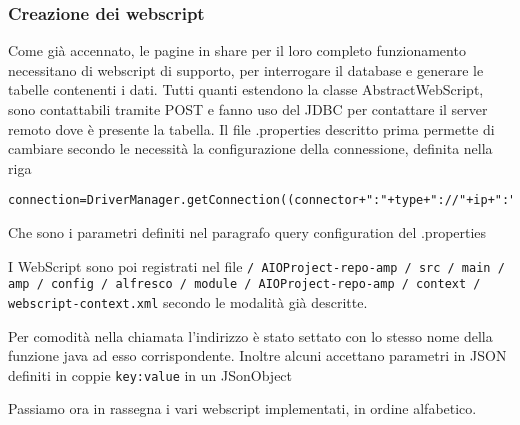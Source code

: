 \subsubsection{Creazione dei webscript}
Come già accennato, le pagine in share per il loro completo funzionamento necessitano di webscript di supporto, per interrogare il database e generare le tabelle contenenti i dati.  Tutti quanti estendono la classe AbstractWebScript, sono contattabili tramite POST e fanno uso del JDBC per contattare il server remoto dove è presente la tabella. Il file .properties descritto prima permette di cambiare secondo le necessità la configurazione della connessione, definita nella riga
\begin{lstlisting}
connection=DriverManager.getConnection((connector+":"+type+"://"+ip+":"+port+"/"+server),id,password);
\end{lstlisting}
Che sono i parametri definiti nel paragrafo query configuration del .properties

I WebScript sono poi registrati nel file \texttt{/ AIOProject-repo-amp / src / main / amp / config / alfresco / module / AIOProject-repo-amp / context / webscript-context.xml} secondo le modalità già descritte.

Per comodità nella chiamata l’indirizzo è stato settato con lo stesso nome della funzione java ad esso corrispondente. Inoltre alcuni  accettano parametri in JSON definiti in coppie \texttt{{key:value}} in un JSonObject

Passiamo ora in rassegna i vari webscript implementati, in ordine alfabetico.
